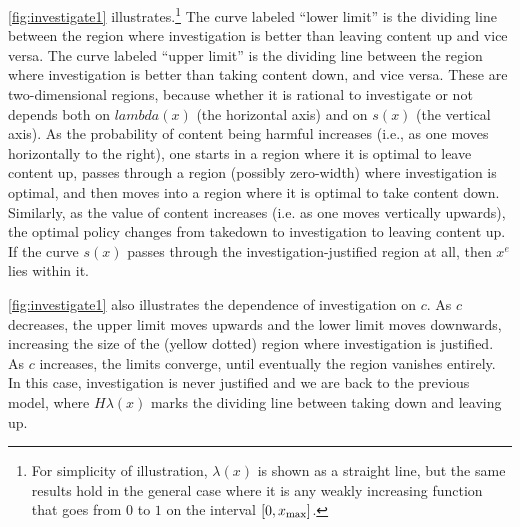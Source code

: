 \autoref{fig:investigate1} illustrates.\footnote{For simplicity of illustration, $\lambda(x)$ is shown as a straight line, but the same results hold in the general case where it is any weakly increasing function that goes from $0$ to $1$ on the interval $[0,x_{\text{max}}]$.} The curve labeled ``lower limit'' is the dividing line between the region where investigation is better than leaving content up and vice versa. The curve labeled ``upper limit'' is the dividing line between the region where investigation is better than taking content down, and vice versa. These are two-dimensional regions, because whether it is rational to investigate or not depends both on $lambda(x)$ (the horizontal axis) and on $s(x)$ (the vertical axis). As the probability of content being harmful increases (i.e., as one moves horizontally to the right), one starts in a region where it is optimal to leave content up, passes through a region (possibly zero-width) where investigation is optimal, and then moves into a region where it is optimal to take content down. Similarly, as the value of content increases (i.e. as one moves vertically upwards), the optimal policy changes from takedown to investigation to leaving content up. If the curve $s(x)$ passes through the investigation-justified region at all, then $x^e$ lies within it.

\autoref{fig:investigate1} also illustrates the dependence of investigation on $c$. As $c$ decreases, the upper limit moves upwards and the lower limit moves downwards, increasing the size of the (yellow dotted) region where investigation is justified. As $c$ increases, the limits converge, until eventually the region vanishes entirely. In this case, investigation is never justified and we are back to the previous model, where $H\lambda(x)$ marks the dividing line between taking down and leaving up.


